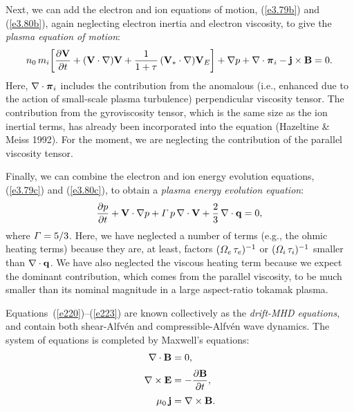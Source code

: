 \documentclass[notitlepage,12pt]{article}
\newcommand{\bpi}{\mbox{\boldmath$\pi$}}
\begin{document}
Next, we can add the electron and ion equations of motion, (\ref{e3.79b}) and (\ref{e3.80b}), again neglecting electron inertia and electron viscosity, 
to give the {\em plasma equation of motion}: 
\begin{equation}
n_0\,m_i\!\left[\frac{\partial {\bf V}}{\partial t} + ({\bf V}\cdot\nabla ){\bf V} + \frac{1}{1+\tau}\,({\bf V}_\ast\cdot\nabla){\bf V}_E\right]
+ \nabla p + \nabla\cdot\bpi_i - {\bf j}\times {\bf B}= 0.
\end{equation}
Here, $\nabla\cdot\bpi_i$ includes the contribution from the anomalous (i.e., enhanced due to the action of small-scale plasma turbulence) perpendicular viscosity tensor. The contribution from the gyroviscosity tensor,
which is the same size as the ion inertial terms, has already been incorporated into the equation (Hazeltine \& Meiss 1992). For the moment, we are neglecting the contribution of the parallel viscosity tensor. 

Finally, we can combine the electron and ion energy evolution equations, (\ref{e3.79c}) and (\ref{e3.80c}), to obtain
a {\em plasma energy evolution equation}:
\begin{equation}
\frac{\partial p}{\partial t} + {\bf V}\cdot\nabla p + {\mit\Gamma}\,p\,\nabla\cdot{\bf V} + \frac{2}{3}\,\nabla\cdot {\bf q}=0, 
\label{e223}
\end{equation}
where ${\mit\Gamma}=5/3$. Here, we have neglected a number of  terms (e.g., the ohmic heating terms) because they
are, at least, factors $({\mit\Omega}_e\,\tau_e)^{-1}$ or  $({\mit\Omega}_i\,\tau_i)^{-1}$ smaller than $\nabla\cdot{\bf q}$. We have also neglected the viscous heating term because we
expect the dominant contribution, which comes from the parallel viscosity, to be much smaller than its nominal magnitude in a large aspect-ratio tokamak
plasma. 

Equations~(\ref{e220})--(\ref{e223}) are known collectively as the {\em drift-MHD equations}, and contain both shear-Alfv\'{e}n
and compressible-Alfv\'{e}n wave dynamics. The system of equations is completed by Maxwell's equations:
\begin{align}
\nabla\cdot{\bf B} &= 0,\\[0.5ex]
\nabla\times {\bf E} &= - \frac{\partial {\bf B}}{\partial t},\\[0.5ex]
\mu_0\,{\bf j} &= \nabla \times {\bf B}.\label{e226}
\end{align}
\end{document}
